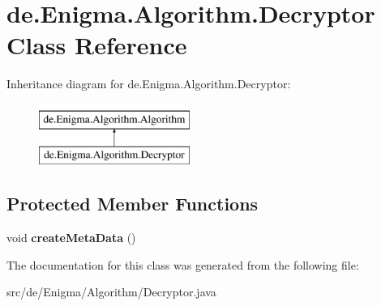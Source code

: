\hypertarget{classde_1_1_enigma_1_1_algorithm_1_1_decryptor}{}\section{de.\+Enigma.\+Algorithm.\+Decryptor Class Reference}
\label{classde_1_1_enigma_1_1_algorithm_1_1_decryptor}
Inheritance diagram for de.\+Enigma.\+Algorithm.\+Decryptor\+:\begin{figure}[H]
\begin{center}
\leavevmode
\includegraphics[height=2.000000cm]{classde_1_1_enigma_1_1_algorithm_1_1_decryptor}
\end{center}
\end{figure}
\subsection*{Protected Member Functions}
\begin{DoxyCompactItemize}
\item 
\mbox{\label{classde_1_1_enigma_1_1_algorithm_1_1_decryptor_a7c62b71a4b7b74d3f4d3d2a79a5dbe83}} 
void {\bfseries create\+Meta\+Data} ()
\end{DoxyCompactItemize}


The documentation for this class was generated from the following file\+:\begin{DoxyCompactItemize}
\item 
src/de/\+Enigma/\+Algorithm/Decryptor.\+java\end{DoxyCompactItemize}
